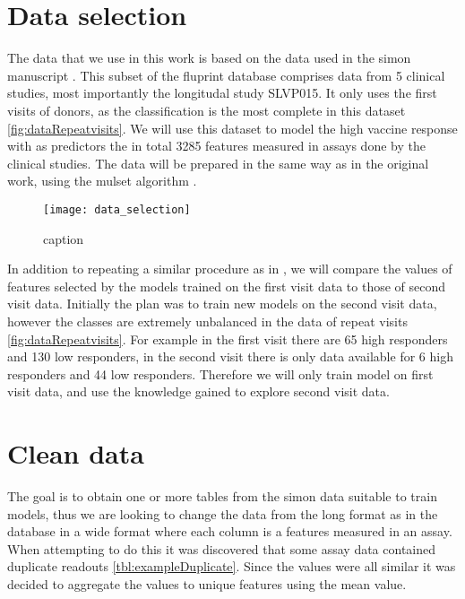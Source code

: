 

\makeglossaries





\tableofcontents
\printglossary[type=bus]
\printglossary[type=dm]
\printglossary[type=\acronymtype]

\section{Data selection}

The data that we use in this work is based on the data used in the simon
manuscript \citep{tomicSIMONAutomatedMachine2019}. This subset of the fluprint
database comprises data from 5 clinical studies, most importantly the
longitudal study SLVP015. It only uses the first visits of donors, as the
classification is the most complete in this dataset
\autoref{fig:dataRepeatvisits}. We will use this dataset to model the high
vaccine response with as predictors the in total 3285 features measured in
assays done by the clinical studies. The data will be prepared in the same way
as in the original work, using the mulset algorithm
\citep{tomicSIMONAutomatedMachine2019}.

\begin{figure}
    \texttt{[image: data\_selection]}
    \caption{caption}\label{fig:dataRepeatvisits}
\end{figure}

In addition to repeating a similar procedure as in
\cite{tomicSIMONAutomatedMachine2019}, we will compare the values of features
selected by the models trained on the first visit data to those of second visit
data. Initially the plan was to train new models on the second visit data,
however the classes are extremely unbalanced in the data of repeat visits
\autoref{fig:dataRepeatvisits}. For example in the first visit there are 65
high responders and 130 low responders, in the second visit there is only data
available for 6 high responders and 44 low responders. Therefore we will only
train model on first visit data, and use the knowledge gained to explore second
visit data.

\section{Clean data}

The goal is to obtain one or more tables from the simon data suitable to train
models, thus we are looking to change the data from the long format as in the
database in a wide format where each column is a features measured in an assay.
When attempting to do this it was discovered that some assay data contained
duplicate readouts \autoref{tbl:exampleDuplicate}. Since the values were all
similar it was decided to aggregate the values to unique features using the
mean value.

